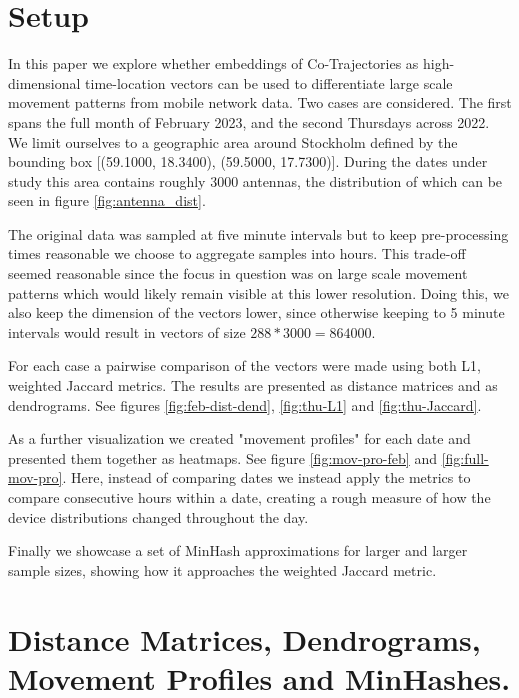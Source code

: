 \documentclass[../main.tex]{subfiles}
\begin{document}
\section{Setup}

In this paper we explore whether embeddings of Co-Trajectories as high-dimensional time-location vectors can be used to differentiate large scale movement patterns from mobile network data. Two cases are considered. The first spans the full month of February 2023, and the second Thursdays across 2022. We limit ourselves to a geographic area around Stockholm defined by the bounding box [(59.1000, 18.3400), (59.5000, 17.7300)]. During the dates under study this area contains roughly 3000 antennas, the distribution of which can be seen in figure \ref{fig:antenna_dist}.

The original data was sampled at five minute intervals but to keep pre-processing times reasonable we choose to aggregate samples into hours.
This trade-off seemed reasonable since the focus in question was on large scale movement patterns which would likely remain visible at this lower resolution. Doing this, we also keep the dimension of the vectors lower, since otherwise keeping to 5 minute intervals would result in vectors of size $288 * 3000 = 864000$. 

For each case a pairwise comparison of the vectors were made using both L1, weighted Jaccard metrics. The results are presented as distance matrices and as dendrograms. See figures \ref{fig:feb-dist-dend}, \ref{fig:thu-L1} and \ref{fig:thu-Jaccard}.

As a further visualization we created "movement profiles" for each date and presented them together as heatmaps. See figure \ref{fig:mov-pro-feb} and \ref{fig:full-mov-pro}. Here, instead of comparing dates we instead apply the metrics to compare consecutive hours within a date, creating a rough measure of how 
the device distributions changed throughout the day.
 
Finally we showcase a set of MinHash approximations for larger and larger sample sizes, showing how it approaches the weighted Jaccard metric.

\section{Distance Matrices, Dendrograms, Movement Profiles and MinHashes.}
\end{document}
